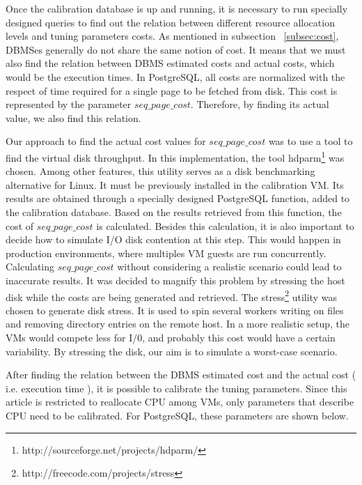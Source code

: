 \documentclass[jidm,a4paper]{jidm} %
\begin{document}
Once the calibration database is up and running, it is necessary to run specially designed queries to find out the relation between different resource allocation levels and tuning parameters costs.  As mentioned in subsection ~\ref{subsec:cost}, DBMSes generally do not  share the same notion of cost. It means that we must also find the relation between DBMS estimated costs and actual costs, which would be the execution times. In PostgreSQL, all costs are normalized with the respect of time required for a single page to be fetched from disk. This cost is represented by the parameter $seq\_page\_cost$. Therefore, by finding its actual value, we also find this relation. 


Our approach to find the actual cost values for $seq\_page\_cost$ was to use a tool to find the virtual disk throughput. In this implementation, the tool hdparm\footnote{http://sourceforge.net/projects/hdparm/} was chosen. Among other features, this utility serves as a disk benchmarking alternative for Linux. It must be previously installed in the calibration VM. Its results are obtained through a specially designed PostgreSQL function, added to the calibration database. Based on the results retrieved from this function, the cost of $seq\_page\_cost$ is calculated. Besides this calculation, it is also important to decide how to simulate I/O disk contention at this step. This would happen in production environments, where multiples VM guests are run concurrently. Calculating $seq\_page\_cost$ without considering a realistic scenario could lead to inaccurate results. It was decided to magnify this problem by stressing the host disk while the costs are being generated and retrieved. The stress\footnote{
http://freecode.com/projects/stress} utility was chosen to generate disk stress. It is used to spin several 
workers writing on files and removing directory entries on the remote host. In a more realistic setup, the VMs would compete less for I/0, and probably this cost would have a certain variability. By stressing the disk, our aim is to simulate a worst-case scenario. 


After finding the relation between the DBMS estimated cost and the actual cost ( i.e. execution time ), it is possible to calibrate the tuning parameters. Since this article is restricted to reallocate CPU among VMs, only parameters that describe CPU need to be calibrated. For PostgreSQL, these parameters are shown below.
\end{document}

